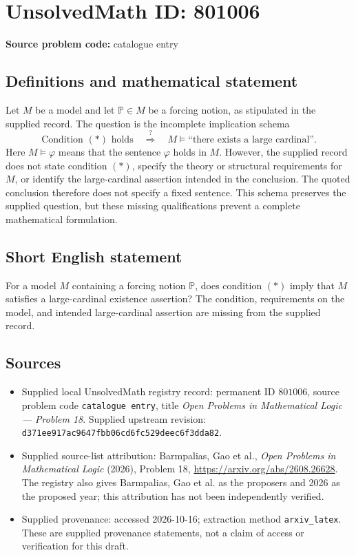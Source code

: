 \documentclass[11pt]{article}
\begin{document}
\section*{UnsolvedMath ID: 801006}
\textbf{Source problem code:} catalogue entry
\subsection{Definitions and mathematical statement}
Let \(M\) be a model and let \(\mathbb P\in M\) be a forcing notion, as stipulated in the supplied record. The question is the incomplete implication schema
\[
\text{Condition }(*)\text{ holds}
\quad\stackrel{?}{\Longrightarrow}\quad
M\models\text{``there exists a large cardinal''}.
\]
Here \(M\models\varphi\) means that the sentence \(\varphi\) holds in \(M\). However, the supplied record does not state condition \((*)\), specify the theory or structural requirements for \(M\), or identify the large-cardinal assertion intended in the conclusion. The quoted conclusion therefore does not specify a fixed sentence. This schema preserves the supplied question, but these missing qualifications prevent a complete mathematical formulation.
\subsection{Short English statement}
For a model \(M\) containing a forcing notion \(\mathbb P\), does condition \((*)\) imply that \(M\) satisfies a large-cardinal existence assertion? The condition, requirements on the model, and intended large-cardinal assertion are missing from the supplied record.
\subsection{Sources}
\begin{itemize}
\item Supplied local UnsolvedMath registry record: permanent ID \(801006\), source problem code \texttt{catalogue entry}, title \emph{Open Problems in Mathematical Logic --- Problem 18}. Supplied upstream revision: \texttt{d371ee917ac9647fbb06cd6fc529deec6f3dda82}.
\item Supplied source-list attribution: Barmpalias, Gao et al., \emph{Open Problems in Mathematical Logic} (2026), Problem 18, \url{https://arxiv.org/abs/2608.26628}. The registry also gives Barmpalias, Gao et al. as the proposers and 2026 as the proposed year; this attribution has not been independently verified.
\item Supplied provenance: accessed 2026-10-16; extraction method \texttt{arxiv\_latex}. These are supplied provenance statements, not a claim of access or verification for this draft.
\end{itemize}
\end{document}
